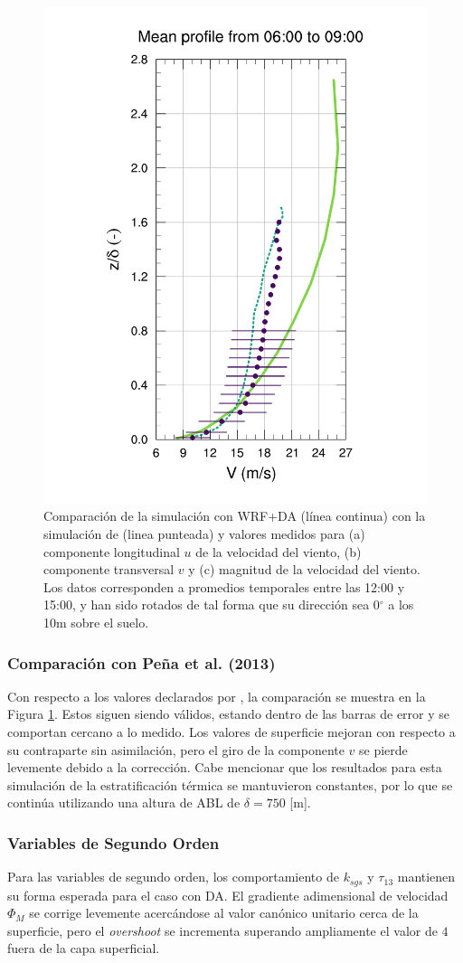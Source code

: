 \begin{figure}[H]
\begin{center}
	\includegraphics[height=0.61\linewidth,page=37,trim={48mm 10mm 38mm 25mm},clip]{Imagenes/06/hov_da/9V}%
	\end{center}
	\caption{Comparación de la simulación con WRF+DA (línea continua) con la simulación de \cite{Pea2013} (linea punteada) y valores medidos para (a) componente longitudinal $u$ de la velocidad del viento, (b) componente transversal $v$ y (c) magnitud de la velocidad del viento. Los datos corresponden a promedios temporales entre las 12:00 y 15:00, y han sido rotados de tal forma que su dirección sea 0$^\circ$ a los 10m sobre el suelo.}
	\label{fig:06_hov_da_peña}
\end{figure}
\subsubsection{Comparación con Peña et al. (2013)}
Con respecto a los valores declarados por \cite{Pea2013}, la comparación se muestra en la Figura \ref{fig:06_hov_da_peña}. Estos siguen siendo válidos, estando dentro de las barras de error y se comportan cercano a lo medido. Los valores de superficie mejoran con respecto a su contraparte sin asimilación, pero el giro de la componente $v$ se pierde levemente debido a la corrección. Cabe mencionar que los resultados para esta simulación de la estratificación térmica se mantuvieron constantes, por lo que se continúa utilizando una altura de ABL de $\delta=750$ [m].
\subsubsection{Variables de Segundo Orden}
Para las variables de segundo orden, los comportamiento de $k_{sgs}$ y $\tau_{13}$ mantienen su forma esperada para el caso con DA. El gradiente adimensional de velocidad $\Phi_M$ se corrige levemente acercándose al valor canónico unitario cerca de la superficie, pero el \emph{overshoot} se incrementa superando ampliamente el valor de $4$ fuera de la capa superficial.

